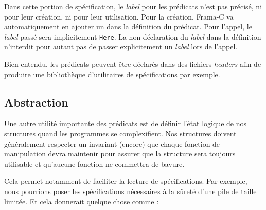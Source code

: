 \documentclass[12pt,francais,]{scrbook}
\begin{document}
Dans cette portion de spécification, le \emph{label} pour les prédicats
n'est pas précisé, ni pour leur création, ni pour leur utilisation. Pour
la création, Frama-C va automatiquement en ajouter un dans la définition
du prédicat. Pour l'appel, le \emph{label} passé sera implicitement
\texttt{Here}. La non-déclaration du \emph{label} dans la définition
n'interdit pour autant pas de passer explicitement un \emph{label} lors
de l'appel.

Bien entendu, les prédicats peuvent être déclarés dans des fichiers
\emph{headers} afin de produire une bibliothèque d'utilitaires de
spécifications par exemple.

\subsection{Abstraction}\label{abstraction}

Une autre utilité importante des prédicats est de définir l'état logique
de nos structures quand les programmes se complexifient. Nos structures
doivent généralement respecter un invariant (encore) que chaque fonction
de manipulation devra maintenir pour assurer que la structure sera
toujours utilisable et qu'aucune fonction ne commettra de bavure.

Cela permet notamment de faciliter la lecture de spécifications. Par
exemple, nous pourrions poser les spécifications nécessaires à la sûreté
d'une pile de taille limitée. Et cela donnerait quelque chose comme :
\end{document}
